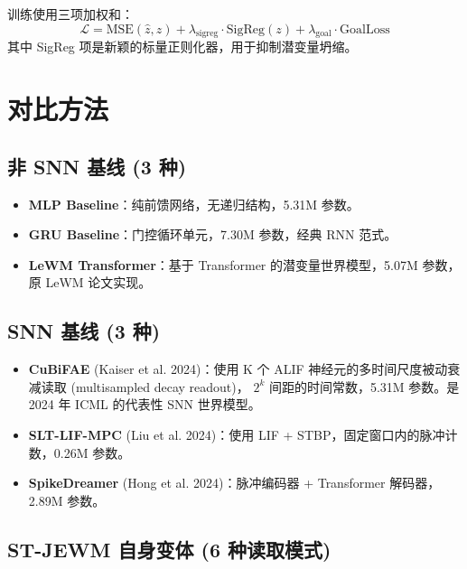 \documentclass[11pt,a4paper]{article}
\begin{document}
训练使用三项加权和：
\begin{equation}
    \mathcal{L} = \text{MSE}(\hat{z}, z) + \lambda_{\text{sigreg}} \cdot \text{SigReg}(z) + \lambda_{\text{goal}} \cdot \text{GoalLoss}
\end{equation}
其中 SigReg 项是新颖的标量正则化器，用于抑制潜变量坍缩。

\section{对比方法}

\subsection{非 SNN 基线 (3 种)}

\begin{itemize}
    \item \textbf{MLP Baseline}：纯前馈网络，无递归结构，5.31M 参数。
    \item \textbf{GRU Baseline}：门控循环单元，7.30M 参数，经典 RNN 范式。
    \item \textbf{LeWM Transformer}：基于 Transformer 的潜变量世界模型，5.07M 参数，原 LeWM 论文实现。
\end{itemize}

\subsection{SNN 基线 (3 种)}

\begin{itemize}
    \item \textbf{CuBiFAE} (Kaiser et al. 2024)：使用 K 个 ALIF 神经元的多时间尺度被动衰减读取 (multisampled decay readout)，
    $2^k$ 间距的时间常数，5.31M 参数。是 2024 年 ICML 的代表性 SNN 世界模型。
    \item \textbf{SLT-LIF-MPC} (Liu et al. 2024)：使用 LIF + STBP，固定窗口内的脉冲计数，0.26M 参数。
    \item \textbf{SpikeDreamer} (Hong et al. 2024)：脉冲编码器 + Transformer 解码器，2.89M 参数。
\end{itemize}

\subsection{ST-JEWM 自身变体 (6 种读取模式)}
\end{document}
